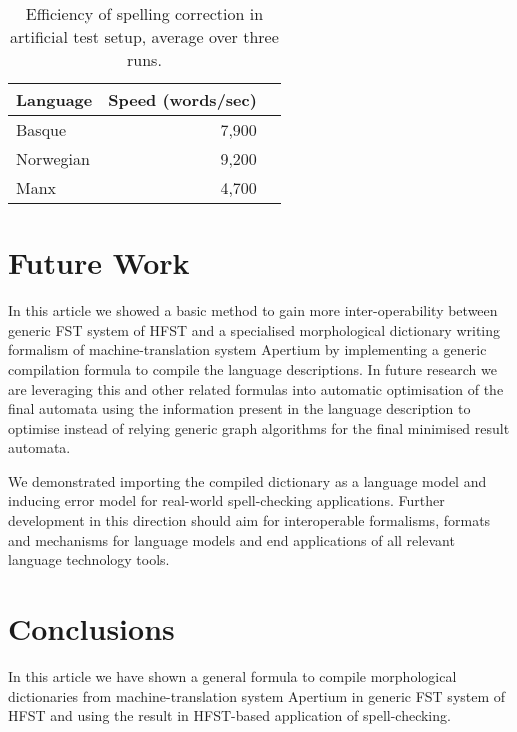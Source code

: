 \documentclass[a4paper]{article}
\begin{document}
\begin{table}[h]
\begin{center}
\begin{tabular}{|l|r|r|}
\hline
\bf Language & \bf Speed (words/sec) \\
\hline
Basque       &  7,900 \\
Norwegian    &  9,200 \\
Manx         &  4,700 \\
\hline
\end{tabular}
\caption{Efficiency of spelling correction in artificial test setup, average 
  over three runs.}
\label{table:spelling}
\end{center}
\end{table}

\section{Future Work}
\label{sec:future}

In this article we showed a basic method to gain more inter-operability between
generic FST system of HFST and a specialised morphological dictionary writing
formalism of machine-translation system Apertium by implementing a generic
compilation formula to compile the language descriptions. In future research
we are leveraging this and other related formulas into automatic optimisation
of the final automata using the information present in the language description
to optimise instead of relying generic graph algorithms for the final minimised
result automata.
 
We demonstrated importing the compiled dictionary as a language model and
inducing error model for real-world spell-checking applications. Further
development in this direction should aim for interoperable formalisms, formats
and mechanisms for language models and end applications of all relevant
language technology tools.

\section{Conclusions}
\label{sec:conclusions}

In this article we have shown a general formula to compile morphological
dictionaries from machine-translation system Apertium in generic FST system of
HFST and using the result in HFST-based application of spell-checking.





\end{document}
